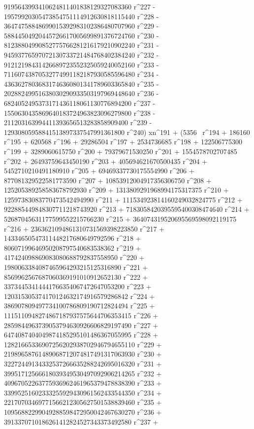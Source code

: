        9195643993410624811401838129327083360 r^227 - 
       19579920305473854751114912630818115440 r^228 - 
       36474758848699015392983102386480707960 r^229 - 
       58844504920445726617005699891376724760 r^230 - 
       81238804990852775766281216179210902240 r^231 - 
       94593776597072130733721484768402384240 r^232 - 
       91212198431426689723552325059240052160 r^233 - 
       71160743870532774991182187930585596480 r^234 - 
       43636278036831746360801341789603365840 r^235 - 
       20288249951638030290933503197969448640 r^236 - 
       6824052495373171436118061130776894200 r^237 - 
       1550630435869640183724963823096279800 r^238 - 
       211203163994411393656513283858909400 r^239 - 
       12930805958841513897337547991361800 r^240) xn^191 + (5356 \
r^194 + 186160 r^195 + 620568 r^196 + 29286504 r^197 + 
       2534736685 r^198 + 122506775300 r^199 + 3289060615750 r^200 + 
       79379671530250 r^201 + 1554578702707485 r^202 + 
       26493759643450190 r^203 + 405694621670500435 r^204 + 
       5452710210491180910 r^205 + 69469337730175554990 r^206 + 
       877081329522581773590 r^207 + 10853912004917356306750 r^208 + 
       125205389258583678792930 r^209 + 
       1313809291968994175317375 r^210 + 
       12597383083770473542494990 r^211 + 
       111534923814160249032824775 r^212 + 
       922885449848307711218743920 r^213 + 
       7183058420395595400308474640 r^214 + 
       52687045631177599552215766230 r^215 + 
       364074319520695569598092119175 r^216 + 
       2363621094861310731569398223850 r^217 + 
       14334650547311448217680649792596 r^218 + 
       80607199646950208797540683538362 r^219 + 
       417424098869083080688792837558950 r^220 + 
       1980063384087465964293215125316890 r^221 + 
       8569962567687060369191010912652130 r^222 + 
       33734453414441766354067472647053200 r^223 + 
       120315305374170124632174916579286842 r^224 + 
       386907809497734100786809190712824494 r^225 + 
       1115110948274867187937575644706353415 r^226 + 
       2859844963739053794630926606829197490 r^227 + 
       6474087404049874185295101486367055995 r^228 + 
       12821665336907256202938702946794655110 r^229 + 
       21989658761489068712074817491317063930 r^230 + 
       32272449134332537266635288242695016320 r^231 + 
       39951712566618039349530497092906214265 r^232 + 
       40967052263775936962461965379478838390 r^233 + 
       33995251602333255929430961562433544350 r^234 + 
       22170703469771566212305627501538839460 r^235 + 
       10956882299049288598472950042467630270 r^236 + 
       3913370710186261412824527343373492580 r^237 + 
